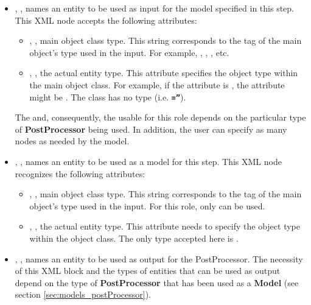 \begin{itemize}
\item {}, , names an entity to
  be used as input for the model specified in this step.
  This XML node accepts the following attributes:
\begin{itemize}
  \item {}, , main object class
    type.
    This string corresponds to the tag of the main object's type used in the
    input.
    For example, , , ,
    etc.
  \item {}, , the actual entity
    type.
    This attribute specifies the object type within the main object class.
    For example, if the   attribute is , 
    the  attribute might be . 
    \nb The class  has no type (i.e.
    \textbf{\texttt{=''}}).
\end{itemize}
\nb The  and, consequently,  the  usable for this
role depends on the particular type of \textbf{PostProcessor} being used.
In addition, the user can specify as many  nodes as needed by the
model.
\item {}, , names an entity to
be used as a model for this step.
This XML node recognizes the following attributes:
\begin{itemize}
  \item {}, , main object class
    type.
    This string corresponds to the tag of the main object's type used in the
    input.
    For this role, only  can be used.
  \item {}, , the actual entity
    type.
    This attribute needs to specify the object type within the
     object class.
    The only type accepted here is .
\end{itemize}
\item {}, , names an
  entity to be used as output for the PostProcessor.
  The necessity of this XML block and the types of entities that can be used as
  output depend on the type of \textbf{PostProcessor} that has been used as a
  \textbf{Model} (see section \ref{sec:models_postProcessor}).

\end{itemize}
